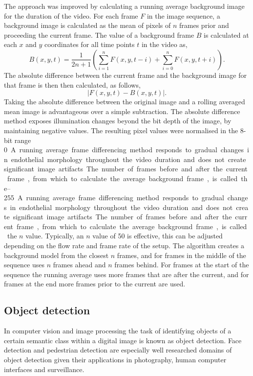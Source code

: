The approach was improved by calculating a running average background image for the duration of the video. For each frame $F$ in the image sequence, a background image is calculated as the mean of pixels of $n$ frames prior and proceeding the current frame. The value of a background frame $B$ is calculated at each $x$ and $y$ coordinates for all time points $t$ in the video as,
\begin{equation}
B(x,y,t) = \frac{1}{2n+1}\left(\sum_{i=1}^{n} F(x,y,t-i) + \sum_{i=0}^{n} F(x,y,t+i)\right).
\end{equation}
The absolute difference between the current frame and the background image for that frame is then then calculated, as follows,
\begin{equation}
\left|F(x,y,t) - B(x,y,t)\right|.
\end{equation}
Taking the absolute difference between the original image and a rolling averaged mean image is advantageous over a simple subtraction. The absolute difference method exposes illumination changes beyond the bit depth of the image, by maintaining negative values. The resulting pixel values were normalised in the 8-bit range \SIrange{0}{255}.

A running average frame differencing method responds to gradual changes in endothelial morphology throughout the video duration and does not create significant image artifacts. The number of frames before and after the current frame, from which to calculate the average background frame, is called the $n$ value. Typically, an $n$ value of 50 is effective, this can be adjusted depending on the flow rate and frame rate of the setup. The algorithm creates a background model from the closest $n$ frames, and for frames in the middle of the sequence uses $n$ frames ahead and $n$ frames behind. For frames at the start of the sequence the running average uses more frames that are after the current, and for frames at the end more frames prior to the current are used.

\subsection{Object detection}
\label{leukocytes:processing:detection}
In computer vision and image processing the task of identifying objects of a certain semantic class within a digital image is known as object detection. Face detection and pedestrian detection are especially well researched domains of object detection given their applications in photography, human computer interfaces and surveillance.

